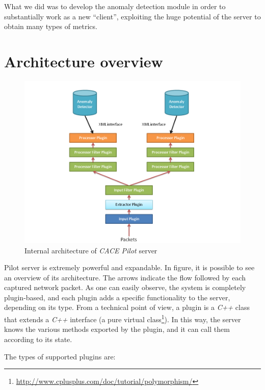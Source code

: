 \documentclass[12pt,a4paper,cucitura]{toptesi}
\begin{document}
What we did was to develop the anomaly detection module in order to substantially work as a new ``client'', exploiting the huge potential of the server to obtain many types of metrics.

\section{Architecture overview}

\begin{figure}
\centering
\includegraphics[width=\linewidth]{pilot1.png}
\caption{Internal architecture of \emph{CACE Pilot} server}
\end{figure}

Pilot server is extremely powerful and expandable.
In figure, it is possible to see an overview of its architecture. 
The arrows indicate the flow followed by each captured network packet.
As one can easily observe, the system is completely plugin-based, and each plugin adds a specific functionality to the server, depending on its type. From a technical point of view, a plugin is a \emph{C++} class that extends a \emph{C++} interface (a pure virtual class\footnote{\url{http://www.cplusplus.com/doc/tutorial/polymorphism/}}).
In this way, the server knows the various methods exported by the plugin, and it can call them according to its state.

The types of supported plugins are:
\end{document}
